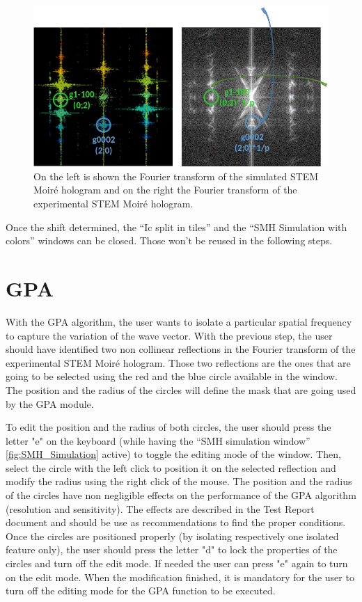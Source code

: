 \documentclass[12pt, titlepage]{article}
\begin{document}
\begin{figure}[H]
\centering
\includegraphics[scale=0.6]{Figures/Read_simulation_2.png}
\caption{On the left is shown the Fourier transform of the simulated STEM Moir{\'e} hologram and on the right the Fourier transform of the experimental STEM Moir{\'e} hologram.}
\label{fig:shift_extraction_2}
\end{figure}

Once the shift determined, the \enquote{Ic split in tiles} and the \enquote{SMH Simulation with colors} windows can be closed. Those won't be reused in the following steps.

\section{GPA}

With the GPA algorithm, the user wants to isolate a particular spatial frequency to capture the variation of the wave vector. With the previous step, the user should have identified two non collinear reflections in the Fourier transform of the experimental STEM Moir{\'e} hologram. Those two reflections are the ones that are going to be selected using the red and the blue circle available in the window. The position and the radius of the circles will define the mask that are going used by the GPA module.\medskip

To edit the position and the radius of both circles, the user should press the letter "e" on the keyboard (while having the \enquote{SMH simulation window} \cref{fig:SMH_Simulation} active) to toggle the editing mode of the window. Then, select the circle with the left click to position it on the selected reflection and modify the radius using the right click of the mouse. The position and the radius of the circles have non negligible effects on the performance of the GPA algorithm (resolution and sensitivity). The effects are described in the Test Report document and should be use as recommendations to find the proper conditions. Once the circles are positioned properly (by isolating respectively one isolated feature only), the user should press the letter "d" to lock the properties of the circles and turn off the edit mode. If needed the user can press "e" again to turn on the edit mode. When the modification finished, it is mandatory for the user to turn off the editing mode for the GPA function to be executed.\medskip
\end{document}
